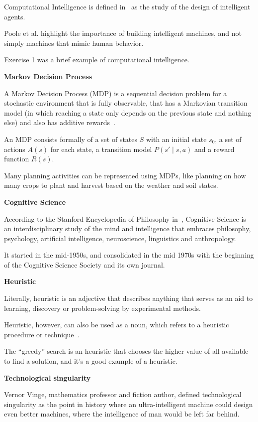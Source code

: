 \documentclass[titlepage, letterpaper, fleqn]{article}
\newcommand{\spacepls}{\vspace{5mm}}
\newcommand{\defys}[1]{
	\spacepls %
	\textbf{#1}
}
\begin{document}
Computational Intelligence is defined in~\cite{CI} as the study of the design of intelligent agents.

Poole et al. highlight the importance of building intelligent machines, and not simply machines that mimic human behavior.

Exercise 1 was a brief example of computational intelligence.

\pagebreak

\defys{Markov Decision Process}

A Markov Decision Process (MDP) is a sequential decision problem for a stochastic environment that is fully observable, that has a Markovian transition model (in which reaching a state only depends on the previous state and nothing else) and also has additive rewards~\cite{MDP}.

An MDP consists formally of a set of states \(S\) with an initial state \(s_0\), a set of actions \(A(s)\) for each state, a transition model \(P(s' \mid s,a)\) and a reward function \(R(s)\).

Many planning activities can be represented using MDPs, like planning on how many crops to plant and harvest based on the weather and soil states.

\defys{Cognitive Science}

According to the Stanford Encyclopedia of Philosophy in~\cite{CogSci}, Cognitive Science is an interdisciplinary study of the mind and intelligence that embraces philosophy, psychology, artificial intelligence, neuroscience, linguistics and anthropology.

It started in the mid-1950s, and consolidated in the mid 1970s with the beginning of the Cognitive Science Society and its own journal.

\defys{Heuristic}

Literally, heuristic is an adjective that describes anything that serves as an aid to learning, discovery or problem-solving by experimental methods.

Heuristic, however, can also be used as a noun, which refers to a heuristic procedure or technique~\cite{heur}.

The ``greedy'' search is an heuristic that chooses the higher value of all available to find a solution, and it's a good example of a heuristic.

\defys{Technological singularity}

Vernor Vinge, mathematics professor and fiction author, defined technological singularity as the point in history where an ultra-intelligent machine could design even better machines, where the intelligence of man would be left far behind.
\end{document}
